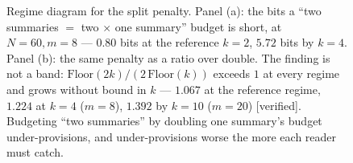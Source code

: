 \begin{figure}[t]
\begin{minipage}{0.48\textwidth}
\end{minipage}
\caption{Regime diagram for the split penalty. Panel (a): the bits a ``two summaries $=$ two $\times$ one summary'' budget is short, at $N{=}60,m{=}8$ --- $0.80$ bits at the reference $k{=}2$, $5.72$ bits by $k{=}4$. Panel (b): the same penalty as a ratio over double. The finding is not a band: $\mathrm{Floor}(2k)/(2\,\mathrm{Floor}(k))$ exceeds $1$ at every regime and grows without bound in $k$ --- $1.067$ at the reference regime, $1.224$ at $k{=}4$ ($m{=}8$), $1.392$ by $k{=}10$ ($m{=}20$) [verified]. Budgeting ``two summaries'' by doubling one summary's budget under-provisions, and under-provisions worse the more each reader must catch.}
\label{fig:r2reg}
\end{figure}
